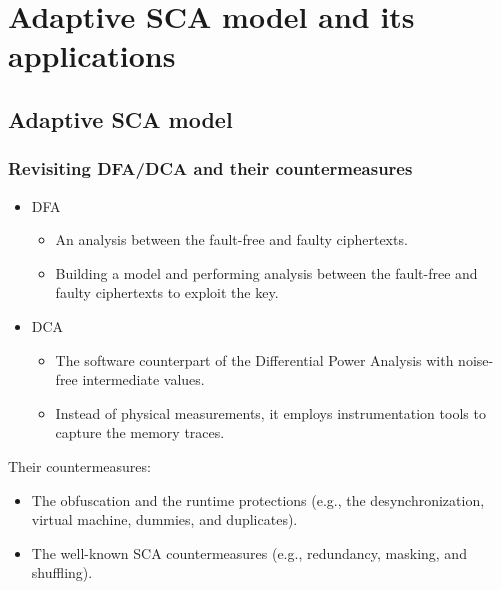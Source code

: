 \documentclass{beamer}
\begin{document}
\section{Adaptive SCA model and its applications}
\subsection{Adaptive SCA model}


\frame
{
	\frametitle{Revisiting DFA/DCA and their countermeasures}
	\begin{itemize}
		\item DFA
		\begin{itemize}
		\item An analysis between the fault-free and faulty ciphertexts.
	    \item Building a model and performing analysis between the fault-free and faulty ciphertexts to exploit the key.

		\end{itemize}
		\item DCA
		\begin{itemize}
			\item The software counterpart of the Differential Power Analysis with noise-free intermediate values.
            \item Instead of physical measurements, it employs instrumentation tools to capture the memory traces.
		\end{itemize}
	\end{itemize}

    Their countermeasures:
	\begin{itemize}
		\item The obfuscation and the runtime protections (e.g., the desynchronization, virtual machine, dummies, and duplicates).
		\item The well-known SCA countermeasures (e.g., redundancy, masking, and shuffling).
	\end{itemize}
}
\end{document}
